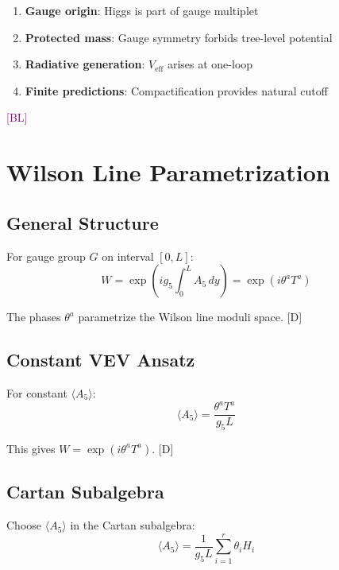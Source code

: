 \documentclass[11pt,a4paper]{article}
\newcommand{\tagD}{\textcolor{blue!70!black}{[D]}}
\newcommand{\tagBL}{\textcolor{purple}{[BL]}}
\begin{document}
\begin{enumerate}
    \item \textbf{Gauge origin}: Higgs is part of gauge multiplet
    \item \textbf{Protected mass}: Gauge symmetry forbids tree-level potential
    \item \textbf{Radiative generation}: $V_{\text{eff}}$ arises at one-loop
    \item \textbf{Finite predictions}: Compactification provides natural cutoff
\end{enumerate}

\tagBL

\section{Wilson Line Parametrization}

\subsection{General Structure}

For gauge group $G$ on interval $[0, L]$:
\begin{equation}
\label{eq:wilson-general}
W = \exp\left(ig_5 \int_0^L A_5 \, dy\right) = \exp(i\theta^a T^a)
\end{equation}

The phases $\theta^a$ parametrize the Wilson line moduli space. \tagD

\subsection{Constant VEV Ansatz}

For constant $\langle A_5 \rangle$:
\begin{equation}
\label{eq:a5-vev}
\langle A_5 \rangle = \frac{\theta^a T^a}{g_5 L}
\end{equation}

This gives $W = \exp(i\theta^a T^a)$. \tagD

\subsection{Cartan Subalgebra}

Choose $\langle A_5 \rangle$ in the Cartan subalgebra:
\begin{equation}
\label{eq:cartan}
\langle A_5 \rangle = \frac{1}{g_5 L} \sum_{i=1}^{r} \theta_i H_i
\end{equation}
\end{document}
